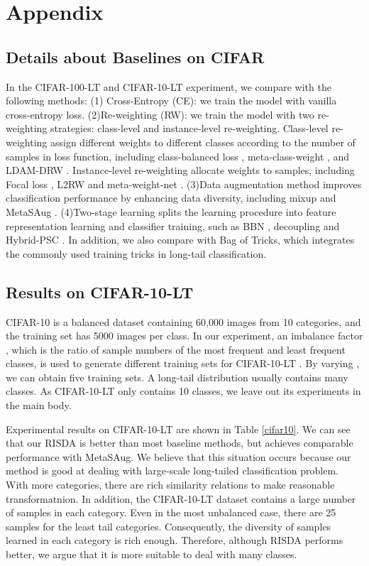 \documentclass[letterpaper]{article} \usepackage{aaai22}  \usepackage{times}  \usepackage{helvet}  \usepackage{courier}  \usepackage[hyphens]{url}  \usepackage{graphicx} \usepackage{bm}
\begin{document}
\section*{Appendix}

\subsection{Details about Baselines on CIFAR}

In the CIFAR-100-LT and CIFAR-10-LT experiment, we compare with the following methods: (1) Cross-Entropy (CE): we train the model with vanilla cross-entropy loss.
(2)Re-weighting (RW): we train the model with two re-weighting strategies: class-level and instance-level re-weighting. Class-level re-weighting assign different weights to different classes according to the number of samples in loss function, including class-balanced loss \cite{cui2019class} , meta-class-weight \cite{jamal2020rethinking}, and LDAM-DRW \cite{cao2019learning}. Instance-level re-weighting allocate weights to samples, including Focal loss \cite{lin2017focal},  L2RW \cite{ren2018learning} and meta-weight-net \cite{shu2019meta}. (3)Data augmentation method improves classification performance by enhancing data diversity, including mixup \cite{zhang2017mixup} and MetaSAug \cite{li2021metasaug}. 
(4)Two-stage learning splits the learning procedure into feature representation learning and classifier training, such as BBN \cite{zhou2020bbn}, decoupling \cite{kang2019decoupling} and Hybrid-PSC \cite{wang2021contrastive}. In addition, we also compare with Bag of Tricks\cite{zhang2021bag}, which integrates the commonly used training tricks in long-tail classification.

\subsection{Results on CIFAR-10-LT}

CIFAR-10 is a balanced dataset containing 60,000 images from 10 categories, and the training set has 5000  images per class. In our experiment, an imbalance factor , which is the ratio of sample numbers of the most frequent and least frequent classes, is used to generate different training sets for CIFAR-10-LT \cite{cui2019class,cao2019learning}. By varying , we can obtain five training sets. A long-tail distribution usually contains many classes. As CIFAR-10-LT only contains 10 classes, we leave out its experiments in the main body. 

Experimental results on CIFAR-10-LT are shown in Table \ref{cifar10}. 
We can see that our RISDA is better than most baseline methods, but achieves comparable performance with MetaSAug. We believe that this situation occurs because our method is good at dealing with large-scale long-tailed classification problem. With more categories, there are rich similarity relations to make reasonable transformatnion. In addition, the CIFAR-10-LT dataset contains a large number of samples in each category. Even in the most unbalanced case, there are 25 samples for the least tail categories. Consequently, the diversity of samples learned in each category is rich enough. Therefore, although RISDA performs better, we argue that it is more suitable to deal with many classes.
\end{document}
